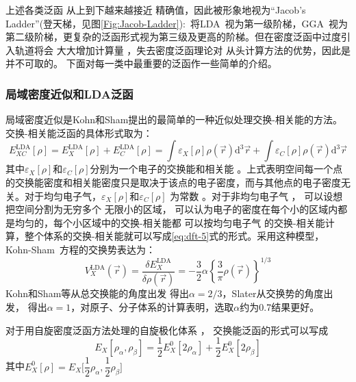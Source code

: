 上述{各类}泛函%
从上到下越来越接近%
精确值，因此被形象地视为``Jacob's Ladder''(登天梯，见图\ref{Fig:Jacob-Ladder}):~将\textrm{LDA~}视为第一级阶梯，\textrm{GGA~}视为第二级阶梯，更复杂的泛函形式视为第三级及更高的阶梯。但在密度泛函中过度引入轨道将会%
{大大增加}计算量%
，失去密度泛函理论对%
从头计算方法的优势，因此是{并}不可取的。
下面对每一类中最重要的泛函作一些简单的介绍。

\subsubsection{局域密度近似和LDA泛函}
局域密度近似是Kohn和Sham提出的最简单的一种近似处理交换-相关能的方法。交换-相关能{泛函}的具体形式取为：
\begin{equation}
  \label{eq:dft-5}
  E_{XC}^{\mathrm{LDA}}[\rho]=E_X^{\mathrm{LDA}}[\rho]+E_C^{\mathrm{LDA}}[\rho]=\int\varepsilon_X[\rho]\rho(\vec{r}) \textrm{d}^3\vec{r}+\int\varepsilon_C[\rho]\rho(\vec{r}) \textrm{d}^3\vec{r}
\end{equation}
其中$\varepsilon_X[\rho]$和$\varepsilon_C[\rho]$分别为{一个电子的}交换能和相关能%
。上式表明空间每一个点的交换能密度和相关能密度只是取决于该点的电子密度，而与其他点的电子密度无关。对{于均匀电子气，}$\varepsilon_X[\rho]$和$\varepsilon_C[\rho]$%
{为常数%
。}对于非均匀电子气%
，%
{可以设想}把空间分割为无穷多个%
{无限}小的区域，%
{可以认为}电子的密度在每个小的区域内都是均匀的，每个小区域中的交换-相关能都%
{可以按}均匀电子气%
的交换-相关能{计算}，整个体系的交换-相关能就可以写成\eqref{eq:dft-5}式的形式。{采用}这种模型{，}%
\textrm{Kohn-Sham~}方程的交换势表达为：
\begin{equation} \label{eq:dft-6}
	V_X^{\mathrm{LDA}}(\vec{r}) =\dfrac {\delta E_X^{\mathrm{LDA}}}{\delta\rho(\vec{r}) }=-\dfrac 32\alpha\left\{\dfrac3\pi\rho(\vec{r}) \right\}^{1/3}
\end{equation}
Kohn和Sham等从总交换能的角度出发%
{得}出$\alpha=2/3$，Slater从交换势的角度出发，%
{得}出$\alpha=1$，对原子、分子体系的计算表明，选取$\alpha$约为0.7结果更好。

对于用自旋密度泛函方法处理的自旋极化体系%
，%
交换能{泛函的}形式可以写成
\begin{equation} \label{eq:dft-7}
E_X[\rho_{\alpha},\rho_{\beta}]=\frac12E_X^{0}[2\rho_{\alpha}]+\frac12E_X^{0}[2\rho_{\beta}]
\end{equation}
其中$E_X^{0}[\rho]=E_X\bigl[\dfrac 12\rho_{\alpha},\dfrac 12\rho_{\beta}\bigr]$

